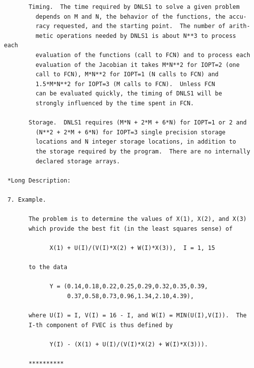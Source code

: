 \documentclass[11pt,twoside]{article}
\begin{document}
\begin{verbatim}
       Timing.  The time required by DNLS1 to solve a given problem
         depends on M and N, the behavior of the functions, the accu-
         racy requested, and the starting point.  The number of arith-
         metic operations needed by DNLS1 is about N**3 to process each
         evaluation of the functions (call to FCN) and to process each
         evaluation of the Jacobian it takes M*N**2 for IOPT=2 (one
         call to FCN), M*N**2 for IOPT=1 (N calls to FCN) and
         1.5*M*N**2 for IOPT=3 (M calls to FCN).  Unless FCN
         can be evaluated quickly, the timing of DNLS1 will be
         strongly influenced by the time spent in FCN.

       Storage.  DNLS1 requires (M*N + 2*M + 6*N) for IOPT=1 or 2 and
         (N**2 + 2*M + 6*N) for IOPT=3 single precision storage
         locations and N integer storage locations, in addition to
         the storage required by the program.  There are no internally
         declared storage arrays.

 *Long Description:

 7. Example.

       The problem is to determine the values of X(1), X(2), and X(3)
       which provide the best fit (in the least squares sense) of

             X(1) + U(I)/(V(I)*X(2) + W(I)*X(3)),  I = 1, 15

       to the data

             Y = (0.14,0.18,0.22,0.25,0.29,0.32,0.35,0.39,
                  0.37,0.58,0.73,0.96,1.34,2.10,4.39),

       where U(I) = I, V(I) = 16 - I, and W(I) = MIN(U(I),V(I)).  The
       I-th component of FVEC is thus defined by

             Y(I) - (X(1) + U(I)/(V(I)*X(2) + W(I)*X(3))).

       **********


\end{verbatim}
\end{document}
